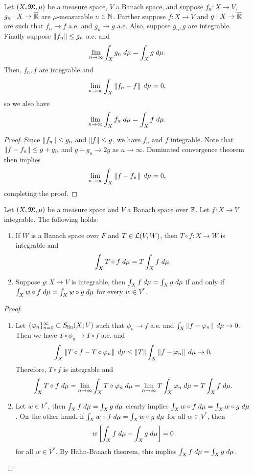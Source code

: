 \documentclass[a4paper]{article}
\begin{document}
\begin{thm}
Let $(X, \mathfrak{M}, \mu)$ be a measure space, $V$ a Banach space,
and suppose $f_n : X \to V$, $g_n : X \to \overline{\mathbb{R}}$ are
$\mu$-measurable $n \in \mathbb{N}$. Further suppose
$f: X \to V$ and $g: X \to \overline{\mathbb{R}}$ are such that
$f_n \to f$ a.e. and $g_n \to g$ a.e.
Also, suppose $g_n, g$ are integrable.
Finally suppose
$\left\lVert f_n\right\rVert \leq g_n$ a.e. and
\[
\lim_{n \to \infty} \int_X g_n \; d \mu = \int_X g \; d \mu.
\]
Then, $f_n, f$ are integrable and
\[
\lim_{n \to \infty} \int_X \left\lVert f_n - f\right\rVert \; d \mu = 0,
\]
so we also have
\[
\lim_{n \to \infty} \int_X f_n \; d \mu = \int_X f \; d \mu.
\]
\end{thm}

\begin{proof}
Since $\left\lVert f_n\right\rVert \leq g_n$ and $\left\lVert f\right\rVert \leq g$,
we have $f_n$ and $f$ integrable. Note that
$\left\lVert f - f_n\right\rVert \leq g + g_n$ and $g + g_n \to 2g$
as $n \to \infty$. Dominated convergence theorem then implies
\[
\lim_{n \to \infty} \int_X \left\lVert f - f_n\right\rVert \; d \mu = 0,
\]
completing the proof.
\end{proof}

\begin{prop}
Let $(X, \mathfrak{M}, \mu)$ be a measure space and $V$ a Banach
space over $\mathbb{F}$.
Let $f : X \to V$ integrable. The following holds:
\begin{enumerate}
\item If $W$ is a Banach space over $F$ and $T \in \mathcal{L}(V, W)$,
then $T \circ f: X \to W$ is integrable and
\[
\int_X T \circ f \; d \mu = T \int_X f \; d \mu.
\]

\item Suppose $g : X \to V$ is integrable, then
$\int_X f \; d \mu = \int_X g \; d \mu$ if and only if
$\int_X w \circ f \; d \mu = \int_X w \circ g \; d \mu$
for every $w \in V^*$.
\end{enumerate}
\end{prop}

\begin{proof}
\begin{enumerate}
\item Let $\{ \varphi_n \}_{n=0}^\infty \subset S_{\text{fin}}(X ; V)$ such that
$\phi_n \to f$ a.e. and $\int_X \left\lVert f - \varphi_n\right\rVert \; d \mu \to 0$.
Then we have $T \circ \phi_n \to T \circ f$ a.e. and
\[
\int_X \left\lVert T \circ f - T \circ \varphi_n\right\rVert \; d \mu
\leq \left\lVert T\right\rVert \int_X \left\lVert f - \varphi_n\right\rVert \; d \mu \to 0.
\]
Therefore, $T \circ f$ is integrable and
\[
\int_X T \circ f \; d \mu = \lim_{n \to \infty}
\int_X T \circ \varphi_n \; d \mu
= \lim_{n \to \infty} T \int_X \varphi_n \; d \mu
= T \int_X f \; d \mu.
\]

\item Let $w \in V^*$, then $\int_X f \; d \mu = \int_X g \; d \mu$
clearly implies $\int_X w \circ f \; d \mu = \int_X w \circ g
\; d \mu$. On the other hand, if $\int_X w \circ f \; d \mu = \int_X
w \circ g \; d \mu$ for all $w \in V^*$, then
\[
w \left[ \int_X f \; d \mu - \int_X g \; d \mu \right] = 0
\]
for all $w \in V^*$. By Hahn-Banach theorem,
this implies $\int_X f \; d \mu = \int_X g \; d \mu$.
\end{enumerate}
\end{proof}
\end{document}
